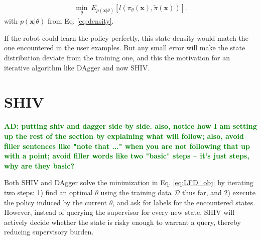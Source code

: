 \documentclass[10pt, conference]{ieeeconf}      %
\newcommand{\bx}{\mathbf{x}}
\newcommand{\acro}{SHIV}
\newcommand{\adnote}[1]{\ifthenelse{\boolean{include-notes}}%
 {\textcolor{green}{\textbf{AD: #1}}}{}}
\newcommand{\fpnote}[1]{\ifthenelse{\boolean{include-notes}}%
 {\textcolor{blue}{\textbf{FP: #1}}}{}}
\begin{document}
 \vspace{-2ex}
\begin{align}\label{eq:LFD_obj}
\underset{\theta}{\min} \: E_{p(\bx|\theta)} [l(\pi_\theta(\bx),\tilde{\pi}(\bx))].
\end{align}
with $p(\bx|\theta)$ from Eq. \ref{eq:density}.

If the robot could learn the policy perfectly, this state density would match the one encountered in the user examples. But any small error will make the state distribution deviate from the training one, and this the motivation for an iterative algorithm like DAgger and now SHIV.


\section{SHIV}
\adnote{putting shiv and dagger side by side. also, notice how I am setting up the rest of the section by explaining what will follow; also, avoid filler sentences like "note that ..." when you are not following that up with a point; avoid filler words like two "basic" steps -- it's just steps, why are they basic?}

Both SHIV and DAgger \cite{ross2010reduction} solve the minimization in Eq. \ref{eq:LFD_obj} by iterating two steps: 1) find an optimal $\theta$ using the training data $\mathcal{D}$ thus far, and 2) execute the policy induced by the current $\theta$, and ask for labels for the encountered states. However, instead of querying the supervisor for every new state, SHIV will actively decide whether the state is risky enough to warrant a query, thereby reducing supervisory burden.

\end{document}
